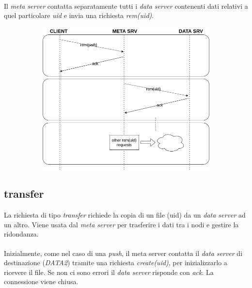 \documentclass{article}
\begin{document}
\paragraph{} Il \emph{meta server} contatta separatamente tutti i \emph{data server} contenenti dati relativi a quel particolare \emph{uid} e invia una richiesta \emph{rem(uid)}.  

\begin{figure}[H]
	\centering
	\begin{subfigure}{0.80\linewidth}
		\includegraphics[width=\linewidth]{../diagrams/requests/rem_request.png}
	\end{subfigure}
\end{figure}



\subsection{transfer}

\paragraph{} La richiesta di tipo \emph{transfer} richiede la copia di un file (uid) da un \emph{data server} ad un altro. Viene usata dal \emph{meta server} per trasferire i dati tra i nodi e gestire la ridondanza.

\paragraph{} Inizialmente, come nel caso di una \emph{push}, il meta server contatta il \emph{data server} di destinazione (\emph{DATA2}) tramite una richiesta \emph{create(uid)}, per inizializzarlo a ricevere il file. Se non ci sono errori il \emph{data server} risponde con \emph{ack}. La connessione viene chiusa. 
\end{document}
